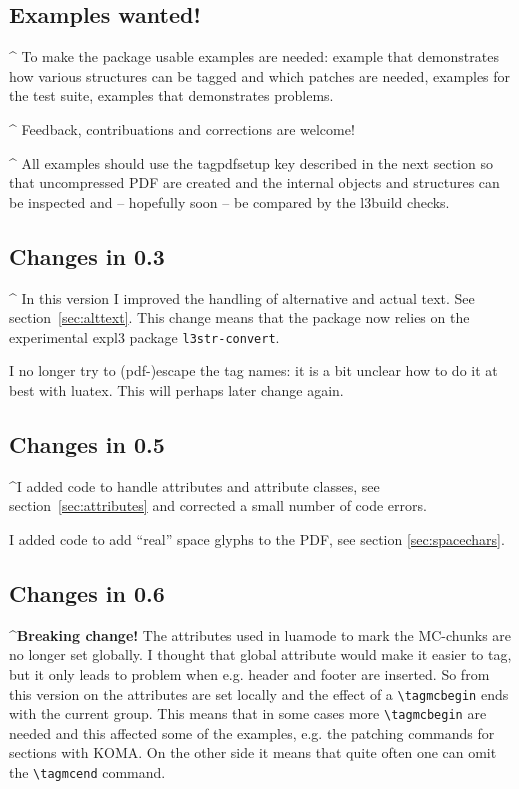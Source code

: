 \documentclass[DIV=12,parskip=half-,bibliography=totoc]{scrartcl}
\newcommand\PDF{PDF}
\begin{document}
\subsection{Examples wanted!}
\TagP^ To make the package usable examples are needed: example that demonstrates how various structures can be tagged and which patches are needed, examples for the test suite, examples that demonstrates problems.\TagPend

\begin{tcolorbox}[]
\TagP^ Feedback, contribuations and corrections are welcome!\TagPend
\end{tcolorbox}

\TagP^ All examples should use the tagpdfsetup key  described in the next section so that uncompressed \PDF{} are created and the internal objects and structures can be inspected and -- hopefully soon -- be compared by the l3build checks.%
\TagPend


\subsection{Changes in 0.3}

\TagP^
In this version I improved the handling of alternative and actual text. See section~\ref{sec:alttext}. This change means that the package now relies on the experimental expl3 package \texttt{l3str-convert}.

\TagP
I no longer try to (pdf-)escape the tag names: it is a bit unclear how to do it at best with luatex. This will perhaps later change again.\TagPend

\subsection{Changes in 0.5}
\TagP^I added code to handle attributes and attribute classes, see section~\ref{sec:attributes} and corrected a small number of code errors.

\TagP I added code to add \enquote{real} space glyphs to the \PDF{}, see section \ref{sec:spacechars}.\TagPend


\subsection{Changes in 0.6}

\TagP^\textbf{Breaking change!} The attributes used in luamode to mark the MC-chunks are no longer set globally. I thought that global attribute would make it easier to tag, but it only leads to problem when e.g. header and footer are inserted. So from this version on the attributes are set locally and the effect of a \verb+\tagmcbegin+ ends with the current group. This means that in some cases more \verb+\tagmcbegin+ are needed and  this affected some of the examples, e.g. the patching commands for sections with KOMA. On the other side it means that quite often one can omit the \verb+\tagmcend+ command.\TagPend
\end{document}
